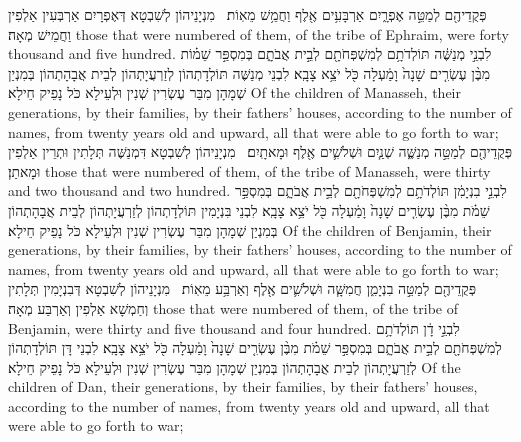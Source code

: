 {פְּקֻדֵיהֶ֖ם לְמַטֵּ֣ה אֶפְרָ֑יִם אַרְבָּעִ֥ים אֶ֖לֶף וַחֲמֵ֥שׁ מֵאֽוֹת׃ \petucha }
{מִנְיָנֵיהוֹן לְשִׁבְטָא דְּאֶפְרָיִם אַרְבְּעִין אַלְפִין וַחֲמֵישׁ מְאָה׃}
{those that were numbered of them, of the tribe of Ephraim, were forty thousand and five hundred.}{}
{לִבְנֵ֣י מְנַשֶּׁ֔ה תּוֹלְדֹתָ֥ם לְמִשְׁפְּחֹתָ֖ם לְבֵ֣ית אֲבֹתָ֑ם בְּמִסְפַּ֣ר שֵׁמ֗וֹת מִבֶּ֨ן עֶשְׂרִ֤ים שָׁנָה֙ וָמַ֔עְלָה כֹּ֖ל יֹצֵ֥א צָבָֽא׃}
{לִבְנֵי מְנַשֶּׁה תּוֹלְדָתְהוֹן לְזַרְעֲיָתְהוֹן לְבֵית אֲבָהָתְהוֹן בְּמִנְיַן שְׁמָהָן מִבַּר עֶשְׂרִין שְׁנִין וּלְעֵילָא כֹּל נָפֵיק חֵילָא׃}
{Of the children of Manasseh, their generations, by their families, by their fathers’ houses, according to the number of names, from twenty years old and upward, all that were able to go forth to war;}{}
{פְּקֻדֵיהֶ֖ם לְמַטֵּ֣ה מְנַשֶּׁ֑ה שְׁנַ֧יִם וּשְׁלֹשִׁ֛ים אֶ֖לֶף וּמָאתָֽיִם׃ \petucha }
{מִנְיָנֵיהוֹן לְשִׁבְטָא דִּמְנַשֶּׁה תְּלָתִין וּתְרֵין אַלְפִין וּמָאתַן׃}
{those that were numbered of them, of the tribe of Manasseh, were thirty and two thousand and two hundred.}{}
{לִבְנֵ֣י בִנְיָמִ֔ן תּוֹלְדֹתָ֥ם לְמִשְׁפְּחֹתָ֖ם לְבֵ֣ית אֲבֹתָ֑ם בְּמִסְפַּ֣ר שֵׁמֹ֗ת מִבֶּ֨ן עֶשְׂרִ֤ים שָׁנָה֙ וָמַ֔עְלָה כֹּ֖ל יֹצֵ֥א צָבָֽא׃}
{לִבְנֵי בִּנְיָמִין תּוֹלְדָתְהוֹן לְזַרְעֲיָתְהוֹן לְבֵית אֲבָהָתְהוֹן בְּמִנְיַן שְׁמָהָן מִבַּר עֶשְׂרִין שְׁנִין וּלְעֵילָא כֹּל נָפֵיק חֵילָא׃}
{Of the children of Benjamin, their generations, by their families, by their fathers’ houses, according to the number of names, from twenty years old and upward, all that were able to go forth to war;}{}
{פְּקֻדֵיהֶ֖ם לְמַטֵּ֣ה בִנְיָמִ֑ן חֲמִשָּׁ֧ה וּשְׁלֹשִׁ֛ים אֶ֖לֶף וְאַרְבַּ֥ע מֵאֽוֹת׃ \petucha }
{מִנְיָנֵיהוֹן לְשִׁבְטָא דְּבִנְיָמִין תְּלָתִין וְחַמְשָׁא אַלְפִין וְאַרְבַּע מְאָה׃}
{those that were numbered of them, of the tribe of Benjamin, were thirty and five thousand and four hundred.}{}
{לִבְנֵ֣י דָ֔ן תּוֹלְדֹתָ֥ם לְמִשְׁפְּחֹתָ֖ם לְבֵ֣ית אֲבֹתָ֑ם בְּמִסְפַּ֣ר שֵׁמֹ֗ת מִבֶּ֨ן עֶשְׂרִ֤ים שָׁנָה֙ וָמַ֔עְלָה כֹּ֖ל יֹצֵ֥א צָבָֽא׃}
{לִבְנֵי דָּן תּוֹלְדָתְהוֹן לְזַרְעֲיָתְהוֹן לְבֵית אֲבָהָתְהוֹן בְּמִנְיַן שְׁמָהָן מִבַּר עֶשְׂרִין שְׁנִין וּלְעֵילָא כֹּל נָפֵיק חֵילָא׃}
{Of the children of Dan, their generations, by their families, by their fathers’ houses, according to the number of names, from twenty years old and upward, all that were able to go forth to war;}{}
